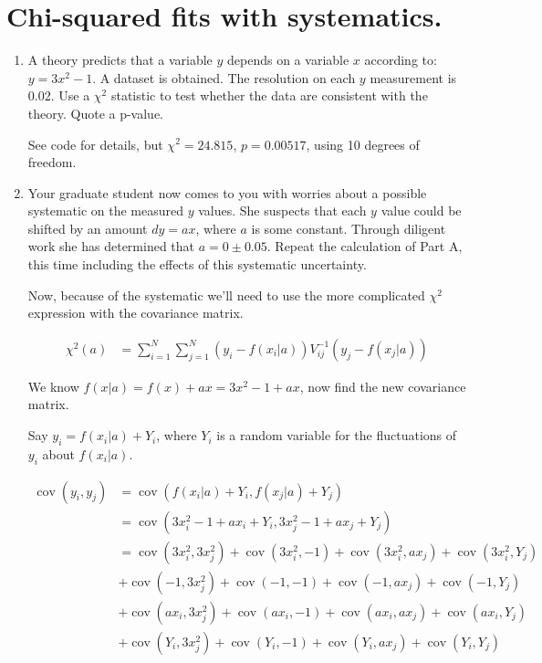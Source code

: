 \section{Chi-squared fits with systematics.}

\begin{enumerate}[label=\textbf{\Alph*}.]
    \item A theory predicts that a variable $y$ depends on a variable $x$ according to: $y = 3x^2 -1$. A dataset is obtained. The resolution on each $y$ measurement is 0.02. Use a $\chi^2$ statistic to test whether the data are consistent with the theory. Quote a p-value.

    See code for details, but $\chi^2=24.815$, $p=0.00517$, using 10 degrees of freedom.

    \item Your graduate student now comes to you with worries about a possible systematic on the measured $y$ values. She suspects that each $y$ value could be shifted by an amount $dy=ax$, where $a$ is some constant. Through diligent work she has determined that $a=0\pm0.05$. Repeat the calculation of Part A, this time including the effects of this systematic uncertainty.

    Now, because of the systematic we'll need to use the more complicated $\chi^2$ expression with the covariance matrix.

    \begin{align*}
        \chi^2(a) &= \sum_{i=1}^N \sum_{j=1}^N (y_i - f(x_i|a)) V_{ij}^{-1} (y_j - f(x_j|a))
    \end{align*}

    We know $f(x|a) = f(x) + ax = 3x^2 - 1 + ax$, now find the new covariance matrix.

    Say $y_i = f(x_i|a) + Y_i$, where $Y_i$ is a random variable for the fluctuations of $y_i$ about $f(x_i|a)$.

    \begin{align*}
        \operatorname{cov}(y_i, y_j) &= \operatorname{cov}(f(x_i|a) + Y_i, f(x_j|a) + Y_j) \\
        &= \operatorname{cov}(3x_i^2 - 1 + ax_i + Y_i, 3x_j^2 - 1 + ax_j + Y_j) \\
        &= \operatorname{cov}(3x_i^2, 3x_j^2)
         + \operatorname{cov}(3x_i^2, - 1)
         + \operatorname{cov}(3x_i^2, ax_j)
         + \operatorname{cov}(3x_i^2, Y_j) \\
        &+ \operatorname{cov}(-1, 3x_j^2)
         + \operatorname{cov}(-1, - 1)
         + \operatorname{cov}(-1, ax_j)
         + \operatorname{cov}(-1, Y_j) \\
        &+ \operatorname{cov}(ax_i, 3x_j^2)
         + \operatorname{cov}(ax_i, - 1)
         + \operatorname{cov}(ax_i, ax_j)
         + \operatorname{cov}(ax_i, Y_j) \\
        &+ \operatorname{cov}(Y_i, 3x_j^2)
         + \operatorname{cov}(Y_i, - 1)
         + \operatorname{cov}(Y_i, ax_j)
         + \operatorname{cov}(Y_i, Y_j) \\
    \end{align*}
    

\end{enumerate}
